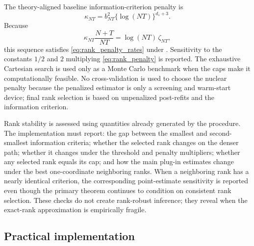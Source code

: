 \documentclass[11pt]{article}
\numberwithin{equation}{section}
\theoremstyle{remark}
\begin{document}
The theory-aligned baseline information-criterion penalty is
\begin{equation}
\label{eq:rank_penalty}
\kappa_{NT}=b_{NT}^2\{\log(NT)\}^{d_s+3}.
\end{equation}
Because
$$
\kappa_{NT}\frac{N+T}{NT}
=
\log(NT)\,\zeta_{NT},
$$
this sequence satisfies \eqref{eq:rank_penalty_rates} under . Sensitivity to the constants $1/2$ and $2$ multiplying \eqref{eq:rank_penalty} is reported. The exhaustive Cartesian search is used only as a Monte Carlo benchmark when the caps make it computationally feasible. No cross-validation is used to choose the nuclear penalty because the penalized estimator is only a screening and warm-start device; final rank selection is based on unpenalized post-refits and the information criterion.

Rank stability is assessed using quantities already generated by the procedure. The implementation must report: the gap between the smallest and second-smallest information criteria; whether the selected rank changes on the denser path; whether it changes under the threshold and penalty multipliers; whether any selected rank equals its cap; and how the main plug-in estimates change under the best one-coordinate neighboring ranks. When a neighboring rank has a nearly identical criterion, the corresponding point-estimate sensitivity is reported even though the primary theorem continues to condition on consistent rank selection. These checks do not create rank-robust inference; they reveal when the exact-rank approximation is empirically fragile.

\fi

\subsection{Practical implementation}
\end{document}

